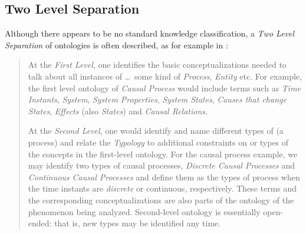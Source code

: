 %
%
%
%
%
%
%

\subsection{Two Level Separation}
\label{two_level_separation_heading}

Although there appears to be no standard knowledge classification, a
\emph{Two Level Separation} of ontologies is often described, as for example in
\cite{gruber}:

\begin{quote}
    At the \emph{First Level}, one identifies the basic conceptualizations
    needed to talk about all instances of \ldots\ some kind of \emph{Process},
    \emph{Entity} etc. For example, the first level ontology of
    \emph{Causal Process} would include terms such as \emph{Time Instants},
    \emph{System}, \emph{System Properties}, \emph{System States},
    \emph{Causes that change States}, \emph{Effects} (also \emph{States}) and
    \emph{Causal Relations}.

    At the \emph{Second Level}, one would identify and name different types of
    (a process) and relate the \emph{Typology} to additional constraints on or
    types of the concepts in the first-level ontology. For the causal process
    example, we may identify two types of causal processes,
    \emph{Discrete Causal Processes} and \emph{Continuous Causal Processes} and
    define them as the types of process when the time instants are
    \emph{discrete} or continuous, respectively. These terms and the
    corresponding conceptualizations are also parts of the ontology of the
    phenomenon being analyzed. Second-level ontology is essentially open-ended:
    that is, new types may be identified any time.
\end{quote}

